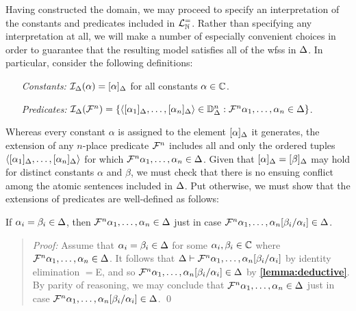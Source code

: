 Having constructed the domain, we may proceed to specify an interpretation of the constants and predicates included in $\mathcal{L}^{=}_{\mathbb{N}}$.
Rather than specifying any interpretation at all, we will make a number of especially convenient choices in order to guarantee that the resulting model satisfies all of the wfss in $\Delta$.
In particular, consider the following definitions:
  \begin{enumerate}[leftmargin=1.5in]
    \item[\it Constants:] $\mathcal{I}_{\Delta}(\alpha)=[\alpha]_{\Delta}$ for all constants $\alpha\in\mathbb{C}$. 
    \item[\it Predicates:] $\mathcal{I}_{\Delta}(\mathcal{F}^n)=\lbrace\langle[\alpha_1]_{\Delta},\ldots,[\alpha_n]_{\Delta}\rangle\in\mathbb{D}_{\Delta}^n:\mathcal{F}^n\alpha_1,\ldots,\alpha_n\in\Delta\rbrace$.
  \end{enumerate}
Whereas every constant $\alpha$ is assigned to the element $[\alpha]_{\Delta}$ it generates, the extension of any $n$-place predicate $\mathcal{F}^n$ includes all and only the ordered tuples $\langle[\alpha_1]_{\Delta},\ldots,[\alpha_n]_{\Delta}\rangle$ for which $\mathcal{F}^n\alpha_1,\ldots,\alpha_n\in\Delta$.
Given that $[\alpha]_{\Delta}=[\beta]_{\Delta}$ may hold for distinct constants $\alpha$ and $\beta$, we must check that there is no ensuing conflict among the atomic sentences included in $\Delta$.
Put otherwise, we must show that the extensions of predicates are well-defined as follows:





\begin{Lthm} \label{lemma:preddef}
  If $\alpha_i=\beta_i\in\Delta$, then $\mathcal{F}^n\alpha_1,\ldots,\alpha_n\in\Delta$ just in case $\mathcal{F}^n\alpha_1,\ldots,\alpha_n[\beta_i/\alpha_i]\in\Delta$.
\end{Lthm}

\begin{quote} 
  \textit{Proof:} 
  Assume that $\alpha_i=\beta_i\in\Delta$ for some $\alpha_i,\beta_i\in\mathbb{C}$ where $\mathcal{F}^n\alpha_1,\ldots,\alpha_n\in\Delta$.
  It follows that $\Delta\vdash\mathcal{F}^n\alpha_1,\ldots,\alpha_n[\beta_i/\alpha_i]$ by identity elimination $=$E, and so $\mathcal{F}^n\alpha_1,\ldots,\alpha_n[\beta_i/\alpha_i]\in\Delta$ by \textbf{\ref{lemma:deductive}}.
  By parity of reasoning, we may conclude that $\mathcal{F}^n\alpha_1,\ldots,\alpha_n\in\Delta$ just in case $\mathcal{F}^n\alpha_1,\ldots,\alpha_n[\beta_i/\alpha_i]\in\Delta$.
  \qed
\end{quote}


